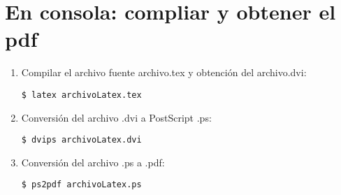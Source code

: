 \documentclass[onecolumn]{article}
\begin{document}
\section{En consola: compliar y obtener el pdf}\label{consola}
\begin{enumerate}
\item Compilar el archivo fuente archivo.tex y obtención del archivo.dvi:
\begin{verbatim}
$ latex archivoLatex.tex
\end{verbatim}
\item Conversión del archivo .dvi a PostScript .ps:
\begin{verbatim}
$ dvips archivoLatex.dvi 
\end{verbatim}
\item Conversión del archivo .ps a .pdf:
\begin{verbatim}
$ ps2pdf archivoLatex.ps
\end{verbatim}
\end{enumerate}
\end{document}
